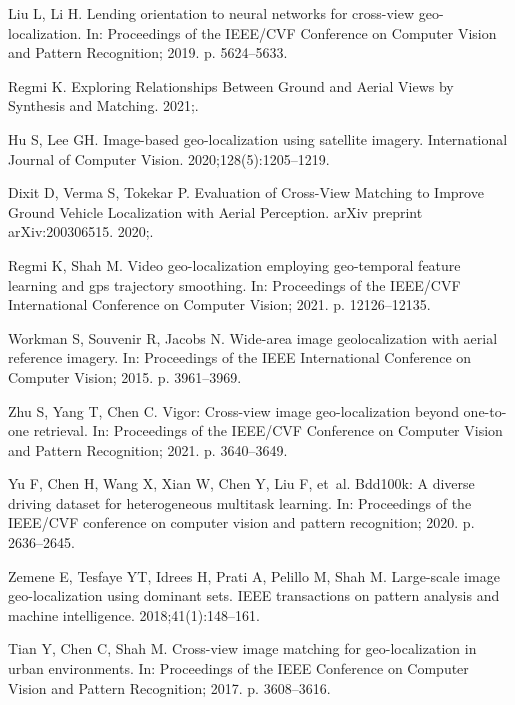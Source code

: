 \documentclass[10pt,letterpaper]{article}
\begin{document}
\begin{thebibliography}{10}
  Liu L, Li H.
  \newblock Lending orientation to neural networks for cross-view
    geo-localization.
  \newblock In: Proceedings of the IEEE/CVF Conference on Computer Vision and
    Pattern Recognition; 2019. p. 5624--5633.
  
  Regmi K.
  \newblock Exploring Relationships Between Ground and Aerial Views by Synthesis
    and Matching. 2021;.
  
  Hu S, Lee GH.
  \newblock Image-based geo-localization using satellite imagery.
  \newblock International Journal of Computer Vision. 2020;128(5):1205--1219.
  
  Dixit D, Verma S, Tokekar P.
  \newblock Evaluation of Cross-View Matching to Improve Ground Vehicle
    Localization with Aerial Perception.
  \newblock arXiv preprint arXiv:200306515. 2020;.
  
  Regmi K, Shah M.
  \newblock Video geo-localization employing geo-temporal feature learning and
    gps trajectory smoothing.
  \newblock In: Proceedings of the IEEE/CVF International Conference on Computer
    Vision; 2021. p. 12126--12135.
  
  Workman S, Souvenir R, Jacobs N.
  \newblock Wide-area image geolocalization with aerial reference imagery.
  \newblock In: Proceedings of the IEEE International Conference on Computer
    Vision; 2015. p. 3961--3969.
  
  Zhu S, Yang T, Chen C.
  \newblock Vigor: Cross-view image geo-localization beyond one-to-one retrieval.
  \newblock In: Proceedings of the IEEE/CVF Conference on Computer Vision and
    Pattern Recognition; 2021. p. 3640--3649.
  
  Yu F, Chen H, Wang X, Xian W, Chen Y, Liu F, et~al.
  \newblock Bdd100k: A diverse driving dataset for heterogeneous multitask
    learning.
  \newblock In: Proceedings of the IEEE/CVF conference on computer vision and
    pattern recognition; 2020. p. 2636--2645.
  
  Zemene E, Tesfaye YT, Idrees H, Prati A, Pelillo M, Shah M.
  \newblock Large-scale image geo-localization using dominant sets.
  \newblock IEEE transactions on pattern analysis and machine intelligence.
    2018;41(1):148--161.
  
  Tian Y, Chen C, Shah M.
  \newblock Cross-view image matching for geo-localization in urban environments.
  \newblock In: Proceedings of the IEEE Conference on Computer Vision and Pattern
    Recognition; 2017. p. 3608--3616.
  

\end{thebibliography}
\end{document}
